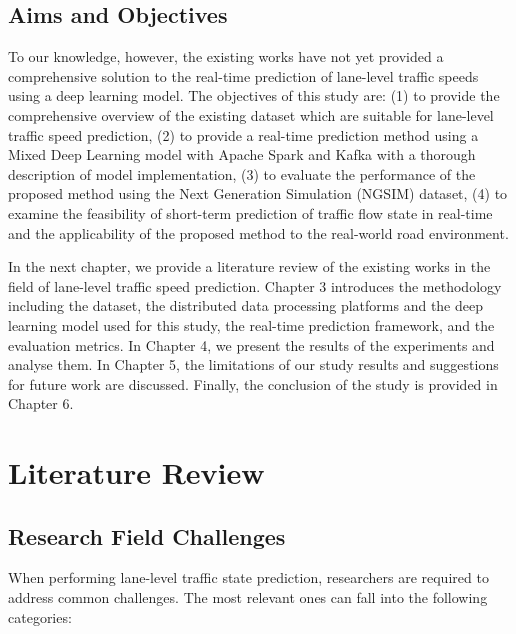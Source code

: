 \documentclass[11pt]{uonthesis}
\begin{document}
\section{Aims and Objectives}
To our knowledge, however, the existing works have not yet provided a comprehensive solution to the real-time prediction of lane-level traffic speeds using a deep learning model. The objectives of this study are: (1) to provide the comprehensive overview of the existing dataset which are suitable for lane-level traffic speed prediction, (2) to provide a real-time prediction method using a Mixed Deep Learning model with Apache Spark and Kafka with a thorough description of model implementation, (3) to evaluate the performance of the proposed method using the Next Generation Simulation (NGSIM) dataset, (4) to examine the feasibility of short-term prediction of traffic flow state in real-time and the applicability of the proposed method to the real-world road environment.

In the next chapter, we provide a literature review of the existing works in the field of lane-level traffic speed prediction. Chapter 3 introduces the methodology including the dataset, the distributed data processing platforms and the deep learning model used for this study, the real-time prediction framework, and the evaluation metrics. In Chapter 4, we present the results of the experiments and analyse them. In Chapter 5, the limitations of our study results and suggestions for future work are discussed. Finally, the conclusion of the study is provided in Chapter 6.

\chapter{Literature Review}

\section{Research Field Challenges}
When performing lane-level traffic state prediction, researchers are required to address common challenges. The most relevant ones can fall into the following categories:
\end{document}
